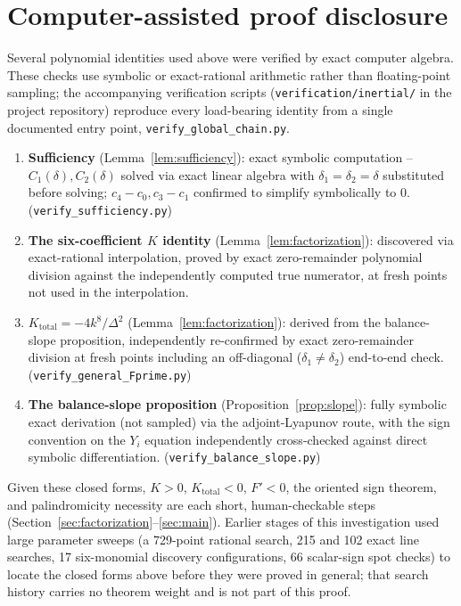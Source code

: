 \documentclass[11pt]{article}
\theoremstyle{definition}
\begin{document}
\section{Computer-assisted proof disclosure}
\label{sec:cas}

Several polynomial identities used above were verified by exact computer
algebra. These checks use symbolic or exact-rational arithmetic rather
than floating-point sampling; the accompanying verification scripts
(\texttt{verification/inertial/} in the project repository) reproduce
every load-bearing identity from a single documented entry point,
\texttt{verify\_global\_chain.py}.

\begin{enumerate}
\item \textbf{Sufficiency} (Lemma~\ref{lem:sufficiency}): exact symbolic
computation -- $C_1(\delta),C_2(\delta)$ solved via exact linear algebra
with $\delta_1=\delta_2=\delta$ substituted before solving;
$c_4-c_0,c_3-c_1$ confirmed to simplify symbolically to $0$.
(\texttt{verify\_sufficiency.py})
\item \textbf{The six-coefficient $K$ identity} (Lemma~\ref{lem:factorization}):
discovered via exact-rational interpolation, proved by exact
zero-remainder polynomial division against the independently computed
true numerator, at fresh points not used in the interpolation.
\item \textbf{$K_{\mathrm{total}}=-4k^8/\Delta^2$} (Lemma~\ref{lem:factorization}):
derived from the balance-slope proposition, independently re-confirmed
by exact zero-remainder division at fresh points including an
off-diagonal ($\delta_1\neq\delta_2$) end-to-end check.
(\texttt{verify\_general\_Fprime.py})
\item \textbf{The balance-slope proposition} (Proposition~\ref{prop:slope}):
fully symbolic exact derivation (not sampled) via the adjoint-Lyapunov
route, with the sign convention on the $Y_i$ equation independently
cross-checked against direct symbolic differentiation.
(\texttt{verify\_balance\_slope.py})
\end{enumerate}

Given these closed forms, $K>0$, $K_{\mathrm{total}}<0$, $F'<0$, the
oriented sign theorem, and palindromicity necessity are each short,
human-checkable steps (Section~\ref{sec:factorization}--\ref{sec:main}).
Earlier stages of this investigation used large parameter sweeps (a
729-point rational search, 215 and 102 exact line searches, 17
six-monomial discovery configurations, 66 scalar-sign spot checks) to
locate the closed forms above before they were proved in general; that
search history carries no theorem weight and is not part of this proof.
\end{document}
